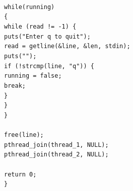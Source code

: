 \documentclass[a4paper, 12pt]{article}
\begin{document}
\begin{appendices}
	\texttt{\hspace*{1em}\\\noindent}
	\texttt{\hspace*{1em}while(running)} \\\noindent
	\texttt{\hspace*{2em}\{ \\\noindent}
	\texttt{\hspace*{2em}while (read != -1) \{ \\\noindent}
	\texttt{\hspace*{3em}puts("Enter q to quit");} \\\noindent
	\texttt{\hspace*{3em}read = getline(\&line, \&len, stdin);} \\\noindent
	\texttt{\hspace*{3em}puts("");} \\\noindent
	\texttt{\hspace*{3em}if (!strcmp(line, "q")) \{ \\\noindent}
	\texttt{\hspace*{4em}running = false;} \\\noindent
	\texttt{\hspace*{4em}break;} \\\noindent
	\texttt{\hspace*{3em}\}} \\\noindent
	\texttt{\hspace*{2em}\}} \\\noindent
	\texttt{\hspace*{1em}\}} \\\noindent
	\texttt{\hspace*{1em}\\\noindent}
	\texttt{\hspace*{1em}free(line);} \\\noindent
	\texttt{\hspace*{1em}pthread\_join(thread\_1, NULL);} \\\noindent
	\texttt{\hspace*{1em}pthread\_join(thread\_2, NULL);} \\\noindent
	\texttt{\hspace*{1em}\\\noindent}
	\texttt{\hspace*{1em}return 0;} \\\noindent
        \texttt{\}} \\\noindent

\end{appendices}
\end{document}
